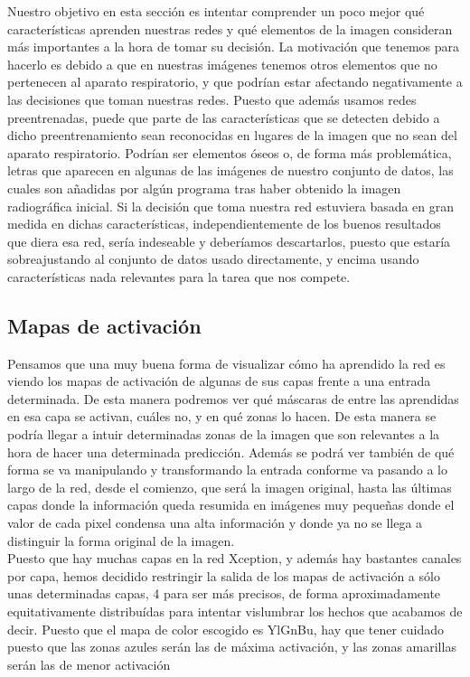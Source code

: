 \documentclass[11pt,a4paper]{article}
\theoremstyle{definition}
\begin{document}
Nuestro objetivo en esta sección es intentar comprender un poco mejor qué características aprenden nuestras redes y qué elementos de la imagen consideran más importantes a la hora de tomar su decisión.  La motivación que tenemos para hacerlo es debido a que en nuestras imágenes tenemos otros elementos que no pertenecen al aparato respiratorio, y que podrían estar afectando negativamente a las decisiones que toman nuestras redes. Puesto que además usamos redes preentrenadas, puede que parte de las características que se detecten debido a dicho preentrenamiento sean reconocidas en lugares de la imagen que no sean del aparato respiratorio. Podrían ser elementos óseos o, de forma más problemática, letras que aparecen en algunas de las imágenes de nuestro conjunto de datos, las cuales son añadidas por algún programa tras haber obtenido la imagen radiográfica inicial.  Si la decisión que toma nuestra red estuviera basada en gran medida en dichas características, independientemente de los buenos resultados que diera esa red, sería indeseable y deberíamos descartarlos, puesto que estaría sobreajustando al conjunto de datos usado directamente, y encima usando características nada relevantes para la tarea que nos compete.


\subsection{Mapas de activación}

Pensamos que una muy buena forma de visualizar cómo ha aprendido la red es viendo los mapas de activación de algunas de sus capas frente a una entrada determinada.  De esta manera podremos ver qué máscaras de entre las aprendidas en esa capa se activan, cuáles no, y en qué zonas lo hacen. De esta manera se podría llegar a intuir determinadas zonas de la imagen que son relevantes a la hora de hacer una determinada predicción.  Además se podrá ver también de qué forma se va manipulando y transformando la entrada conforme va pasando a lo largo de la red, desde el comienzo, que será la imagen original, hasta las últimas capas donde la información queda resumida en imágenes muy pequeñas donde el valor de cada pixel condensa una alta información y donde ya no se llega a distinguir la forma original de la imagen.\\

Puesto que hay muchas capas en la red Xception, y además hay bastantes canales por capa, hemos decidido restringir la salida de los mapas de activación a sólo unas determinadas capas,  4 para ser más precisos, de forma aproximadamente equitativamente distribuídas para intentar vislumbrar los hechos que acabamos de decir.  Puesto que el mapa de color escogido es YlGnBu, hay que tener cuidado puesto que las zonas azules serán las de máxima activación, y las zonas amarillas serán las de menor activación\\
\end{document}
